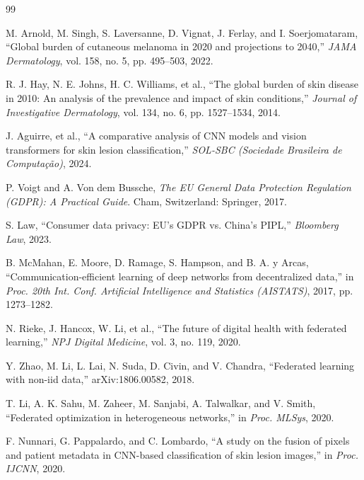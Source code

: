 \documentclass[utf8]{FrontiersinHarvard} %
\begin{document}
\iffalse
\begin{thebibliography}{99}

M. Arnold, M. Singh, S. Laversanne, D. Vignat, J. Ferlay, and I. Soerjomataram,
“Global burden of cutaneous melanoma in 2020 and projections to 2040,”
\emph{JAMA Dermatology}, vol. 158, no. 5, pp. 495–503, 2022.

R. J. Hay, N. E. Johns, H. C. Williams, et al.,
“The global burden of skin disease in 2010: An analysis of the prevalence and impact of skin conditions,”
\emph{Journal of Investigative Dermatology}, vol. 134, no. 6, pp. 1527–1534, 2014.

J. Aguirre, et al.,
“A comparative analysis of CNN models and vision transformers for skin lesion classification,”
\emph{SOL-SBC (Sociedade Brasileira de Computação)}, 2024.

P. Voigt and A. Von dem Bussche,
\emph{The EU General Data Protection Regulation (GDPR): A Practical Guide}.
Cham, Switzerland: Springer, 2017.

S. Law,
“Consumer data privacy: EU’s GDPR vs. China’s PIPL,”
\emph{Bloomberg Law}, 2023.

B. McMahan, E. Moore, D. Ramage, S. Hampson, and B. A. y Arcas,
“Communication-efficient learning of deep networks from decentralized data,”
in \emph{Proc. 20th Int. Conf. Artificial Intelligence and Statistics (AISTATS)}, 2017, pp. 1273–1282.

N. Rieke, J. Hancox, W. Li, et al.,
“The future of digital health with federated learning,”
\emph{NPJ Digital Medicine}, vol. 3, no. 119, 2020.

Y. Zhao, M. Li, L. Lai, N. Suda, D. Civin, and V. Chandra,
“Federated learning with non-iid data,”
arXiv:1806.00582, 2018.

T. Li, A. K. Sahu, M. Zaheer, M. Sanjabi, A. Talwalkar, and V. Smith,
“Federated optimization in heterogeneous networks,”
in \emph{Proc. MLSys}, 2020.

F. Nunnari, G. Pappalardo, and C. Lombardo,
“A study on the fusion of pixels and patient metadata in CNN-based classification of skin lesion images,”
in \emph{Proc. IJCNN}, 2020.


\end{thebibliography}
\end{document}
